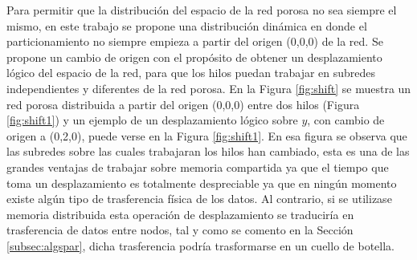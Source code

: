 Para permitir que la distribución del espacio de la red porosa no sea siempre el mismo, en este trabajo se propone una distribución dinámica en donde el particionamiento no siempre empieza a partir del origen (0,0,0) de la red. Se propone un cambio de origen con el propósito de obtener un desplazamiento lógico del espacio de la red, para que los hilos  puedan trabajar en subredes independientes y diferentes de la red porosa. En la Figura \ref{fig:shift} se muestra un red porosa distribuida a partir del origen (0,0,0) entre dos hilos (Figura \ref{fig:shift1})  y un ejemplo de un desplazamiento lógico sobre $y$, con cambio de origen a (0,2,0), puede verse en la Figura \ref{fig:shift1}. En esa figura se observa que las subredes sobre las cuales  trabajaran los hilos han cambiado, esta es una de las grandes ventajas de trabajar sobre memoria compartida ya que el tiempo  que  toma un desplazamiento es totalmente despreciable ya que en ningún momento existe algún tipo de trasferencia física de los datos.  Al contrario, si se utilizase memoria distribuida esta operación de desplazamiento se traduciría en trasferencia de  datos entre nodos, tal y como se comento en la Sección \ref{subsec:algspar}, dicha trasferencia podría trasformarse en un cuello de botella.\\

